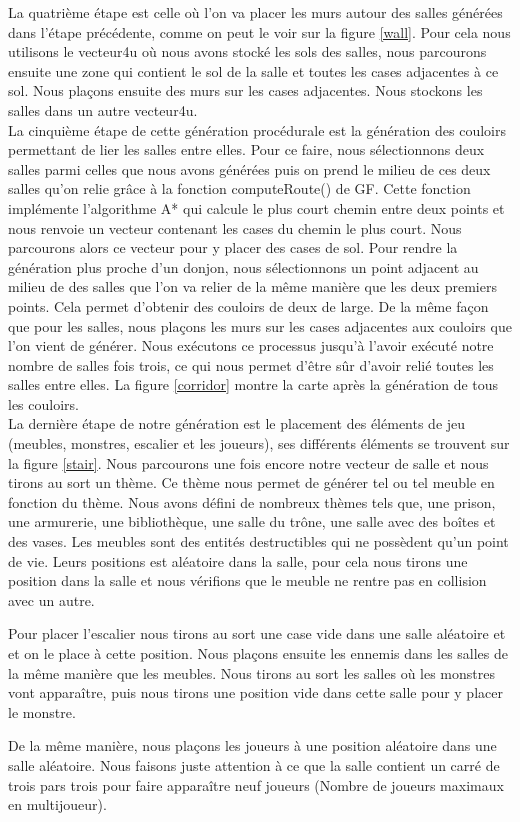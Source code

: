 \documentclass[a4paper, 12pt, twoside]{article}
\begin{document}
La quatrième étape est celle où l'on va placer les murs autour des salles générées dans l'étape précédente, comme on peut le voir sur la figure \ref{wall}. Pour cela nous utilisons le vecteur4u où nous avons stocké les sols des salles, nous parcourons ensuite une zone qui contient le sol de la salle et toutes les cases adjacentes à ce sol. Nous plaçons ensuite des murs sur les cases adjacentes. Nous stockons les salles dans un autre vecteur4u. \\

La cinquième étape de cette génération procédurale est la génération des couloirs permettant de lier les salles entre elles. Pour ce faire, nous sélectionnons deux salles parmi celles que nous avons générées puis on prend le milieu de ces deux salles qu'on relie grâce à la fonction computeRoute() de GF. Cette fonction implémente l'algorithme A* qui calcule le plus court chemin entre deux points et nous renvoie un vecteur contenant les cases du chemin le plus court. Nous parcourons alors ce vecteur pour y placer des cases de sol. Pour rendre la génération plus proche d'un donjon, nous sélectionnons un point adjacent au milieu de des salles que l'on va relier de la même manière que les deux premiers points. Cela permet d'obtenir des couloirs de deux de large. De la même façon que pour les salles, nous plaçons les murs sur les cases adjacentes aux couloirs que l'on vient de générer. Nous exécutons ce processus jusqu'à l'avoir exécuté notre nombre de salles fois trois, ce qui nous permet d'être sûr d'avoir relié toutes les salles entre elles. La figure \ref{corridor} montre la carte après la génération de tous les couloirs.\\

La dernière étape de notre génération est le placement des éléments de jeu (meubles, monstres, escalier et les joueurs), ses différents éléments se trouvent sur la figure \ref{stair}. Nous parcourons une fois encore notre vecteur de salle et nous tirons au sort un thème. Ce thème nous permet de générer tel ou tel meuble en fonction du thème. Nous avons défini de nombreux thèmes tels que, une prison, une armurerie, une bibliothèque, une salle du trône, une salle avec des boîtes et des vases. Les meubles sont des entités destructibles qui ne possèdent qu'un point de vie. Leurs positions est aléatoire dans la salle, pour cela nous tirons une position dans la salle et nous vérifions que le meuble ne rentre pas en collision avec un autre. \par
Pour placer l'escalier nous tirons au sort une case vide dans une salle aléatoire et et on le place à cette position.
Nous plaçons ensuite les ennemis dans les salles de la même manière que les meubles. Nous tirons au sort les salles où les monstres vont apparaître, puis nous tirons une position vide dans cette salle pour y placer le monstre. \par
De la même manière, nous plaçons les joueurs à une position aléatoire dans une salle aléatoire. Nous faisons juste attention à ce que la salle contient un carré de trois pars trois pour faire apparaître neuf joueurs (Nombre de joueurs maximaux en multijoueur). \par
\newpage
\end{document}

